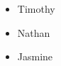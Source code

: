 \documentclass{article}
\begin{document}
	
	\begin{itemize}
		\item Timothy
		\item Nathan
		\item Jasmine
	\end{itemize}
\end{document}
